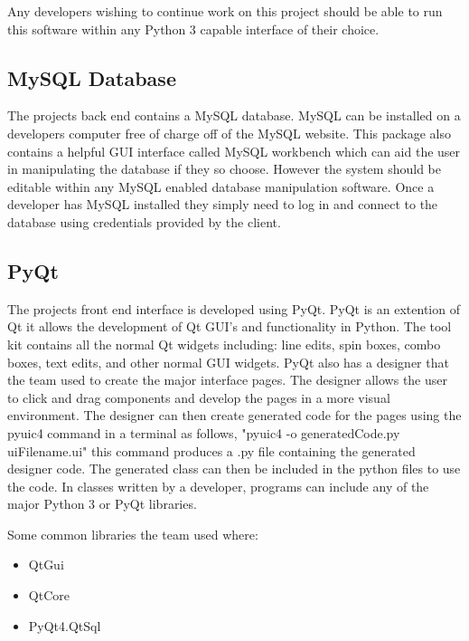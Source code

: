 Any developers wishing to continue work on this project should be able to run this software within any Python 3 capable interface of their choice.  

\subsection{MySQL Database}
The projects back end contains a MySQL database. MySQL can be installed on a developers computer free of charge off of the MySQL website. This package also contains a helpful GUI interface called MySQL workbench which can aid the user in manipulating the database if they so choose. However the system should be editable within any MySQL enabled database manipulation software. Once a developer has MySQL installed they simply need to log in and connect to the database using credentials provided by the client.

\subsection{PyQt}
The projects front end interface is developed using PyQt. PyQt is an extention of Qt it allows the development of Qt GUI's and functionality in Python. The tool kit contains all the normal Qt widgets including: line edits, spin boxes, combo boxes, text edits, and other normal GUI widgets. PyQt also has a designer that the team used to create the major interface pages. The designer allows the user to click and drag components and develop the pages in a more visual environment. The designer can then create generated code for the pages using the pyuic4 command in a terminal as follows, "pyuic4 -o generatedCode.py uiFilename.ui" this command produces a .py file containing the generated designer code. The generated class can then be included in the python files to use the code. In classes written by a developer, programs can include any of the major Python 3 or PyQt libraries.

Some common libraries the team used where:
\begin{itemize}
\item QtGui
\item QtCore
\item PyQt4.QtSql
\end{itemize}



